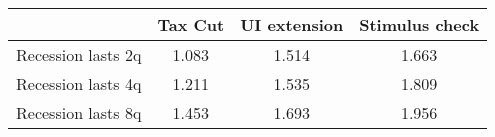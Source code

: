 \begin{tabular}{@{}lccc@{}}
\toprule
& Tax Cut    & UI extension    & Stimulus check    \\  \midrule
Recession lasts 2q &1.083  & 1.514  & 1.663     \\
Recession lasts 4q &1.211  & 1.535  & 1.809     \\
Recession lasts 8q &1.453  & 1.693  & 1.956     \\
\end{tabular}
